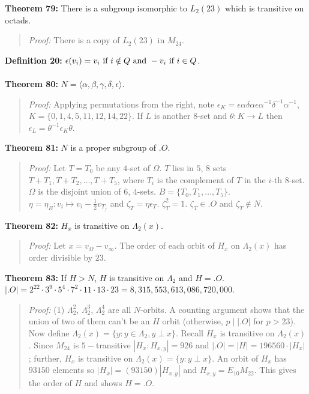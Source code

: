 {\bf Theorem 79:}
There is a subgroup isomorphic to $L_2(23)$ which is
transitive on octads. 
\begin{quote}
\emph{Proof:} 
There is a copy of $L_2(23)$ in $M_{24}$.
\end{quote}
{\bf Definition 20:} $\epsilon(v_i) = 
v_i \textnormal{ if } i \notin Q \textnormal{ and } -v_i \textnormal{ if } i \in Q $.
\\
\\
{\bf Theorem 80:} $N= \langle \alpha, \beta, \gamma, \delta, \epsilon \rangle$.
\begin{quote}
\emph{Proof:} 
Applying permutations from the right, note $\epsilon_K= 
\epsilon \alpha  \delta \alpha  \epsilon \alpha^{-1} \delta^{-1} \alpha^{-1}$, 
$K= \{ 0,1,4,5,11,12,14,22 \}$.  If $L$ is another $8$-set and $\theta: K \rightarrow L$ then
$\epsilon_L = \theta^{-1} \epsilon_K \theta$.
\end{quote}
{\bf Theorem 81:}
$N$ is a proper subgroup of $.O$.
\begin{quote}
\emph{Proof:} 
Let $T=T_0$ be any $4$-set of $\Omega$.  $T$ lies in $5$, $8$ sets
$ T+T_1, T+T_2, \ldots, T+T_5$, where $T_i$ is the complement of
$T$ in the $i$-th $8$-set.  $\Omega$ is the disjoint union of
$6$, $4$-sets.  $B= \{ T_0 , T_1 , \ldots , T_5 \}$.
$\eta= \eta_B: v_i \mapsto v_i- {\frac 1 2} v_{T_j}$ and
$\zeta_T= \eta \epsilon_T$.  $\zeta_T^2=1$.  $\zeta_T \in .O$ and
$\zeta_T \notin N$.
\end{quote}
{\bf Theorem 82:}
$H_x$ is transitive on $\Lambda_2(x)$.
\begin{quote}
\emph{Proof:} 
Let $x= v_{\Omega}- v_{\infty}$.  The order of each orbit of $H_x$ on $\Lambda_2(x)$
has order divisible by $23$.
\end{quote}
{\bf Theorem 83:}
If $H>N$, $H$ is transitive on $\Lambda_2$ and $H=.O$.  $|.O|=
2^{22} \cdot 3^{9} \cdot 5^4 \cdot 7^2 \cdot 11 \cdot 13 \cdot 23= 8,315,553,613,086,720,000$.
\begin{quote}
\emph{Proof:} 
(1) $\Lambda_2^2$, $\Lambda_2^3$, $\Lambda_2^4$ are all $N$-orbits.  
A counting argument shows that the union of two
of them can't be an $H$ orbit (otherwise, $p \mid |.O|$ for $p>23$).  Now define
$\Lambda_2 (x)= \{ y: y \in \Lambda_2, y \perp x \}$.
Recall $H_x$ is transitive on $\Lambda_2(x)$.
Since $M_{24}$ is $5-$transitive $|H_x : H_{x,y}|= 926$ and
$|.O|= |H| = 196560 \cdot |H_x|$; further,  $H_x$ is transitive on 
$\Lambda_2 (x)= \{ y: y \perp x \}$.  An orbit of $H_x$ has $93150$ elements so
$|H_x|= (93150) |H_{x,y}|$ and $H_{x,y} = E_{10} M_{22}$.  This gives the order of
$H$ and shows $H=.O$.
\end{quote}
